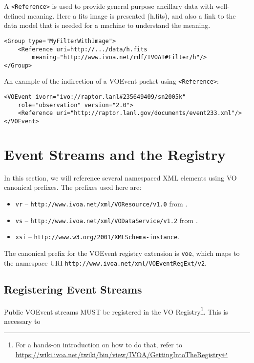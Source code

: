 \documentclass[11pt,a4paper]{ivoa}
\begin{document}
A {\tt <Reference>} is used to provide general purpose ancillary data with
well-defined meaning. Here a fits image is presented (h.fits), and also a link
to the data model that is needed for a machine to understand the meaning.
\begin{lstlisting}
<Group type="MyFilterWithImage">
    <Reference uri=http://.../data/h.fits
        meaning="http://www.ivoa.net/rdf/IVOAT#Filter/h"/>
</Group>
\end{lstlisting}
An example of the indirection of a VOEvent packet using {\tt <Reference>}:
\begin{lstlisting}
<VOEvent ivorn="ivo://raptor.lanl#235649409/sn2005k"
    role="observation" version="2.0">
    <Reference uri="http://raptor.lanl.gov/documents/event233.xml"/>
</VOEvent>
\end{lstlisting}

\section{Event Streams and the Registry}
\label{sec:registry-matters}

In this section, we will reference several namespaced XML elements using
VO canonical prefixes.  The prefixes used here are:

\begin{itemize}
\item \verb|vr| -- \nolinkurl{http://www.ivoa.net/xml/VOResource/v1.0}
from \citet{2018ivoa.spec.0625P}.
\item \verb|vs| --
\nolinkurl{http://www.ivoa.net/xml/VODataService/v1.2}
from \citet{2021ivoa.spec.1102D}.
\item \verb|xsi| --
\nolinkurl{http://www.w3.org/2001/XMLSchema-instance}.
\end{itemize}

The canonical prefix for the VOEvent registry extension is \verb|voe|,
which maps to the namespace URI
\nolinkurl{http://www.ivoa.net/xml/VOEventRegExt/v2}.

\subsection{Registering Event Streams}
\label{sec:registering}

Public VOEvent streams MUST be registered in the VO
Registry\footnote{For a hands-on introduction on how to do that, refer
to
\url{https://wiki.ivoa.net/twiki/bin/view/IVOA/GettingIntoTheRegistry}}.
This is necessary to
\end{document}
